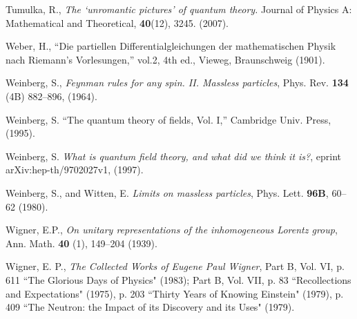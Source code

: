 \documentclass[11pt]{article}
\theoremstyle{definition}
\numberwithin{equation}{section}
\begin{document}
\begin{thebibliography}{[KTZ2020]}
Tumulka, R.,
\textit{The ‘unromantic pictures’ of quantum theory.}
 Journal of Physics A: Mathematical and Theoretical, \textbf{40}(12), 3245. (2007).\vspace{-4pt}

  Weber, H.,
  ``{Die partiellen Differentialgleichungen der mathematischen Physik nach Riemann's Vorlesungen},''
  vol.2, 4th ed., Vieweg, Braunschweig (1901).\vspace{-4pt}

Weinberg, S.,
\textit{Feynman rules for any spin. II.  Massless particles},
Phys. Rev. \textbf{134} (4B) 882--896, (1964).

  Weinberg, S.
  ``The quantum theory of fields, Vol. I,''
  Cambridge Univ. Press, (1995).%

  Weinberg, S.
  \textit{What is quantum field theory, and what did we think it is?},
  eprint arXiv:hep-th/9702027v1, (1997).\vspace{-4pt}

  Weinberg, S.,
  and
  Witten, E.
  \textit{Limits on massless particles},
  {Phys. Lett.} \textbf{96B}, 60--62 (1980).\vspace{-4pt}

     Wigner, E.P.,
     \textit{On unitary representations of the inhomogeneous Lorentz group},
     Ann. Math. \textbf{40} (1), 149--204 (1939).\vspace{-4pt}

Wigner, E. P.,
\textit{The Collected Works of Eugene Paul Wigner}, Part B, Vol. VI, p. 611 ``The Glorious Days of Physics" (1983); 
Part B, Vol. VII, p. 83  ``Recollections and Expectations" (1975), p. 203 ``Thirty Years of Knowing Einstein" (1979), 
p. 409 ``The Neutron: the Impact of its Discovery and its Uses" (1979).

\end{thebibliography}
\end{document}
